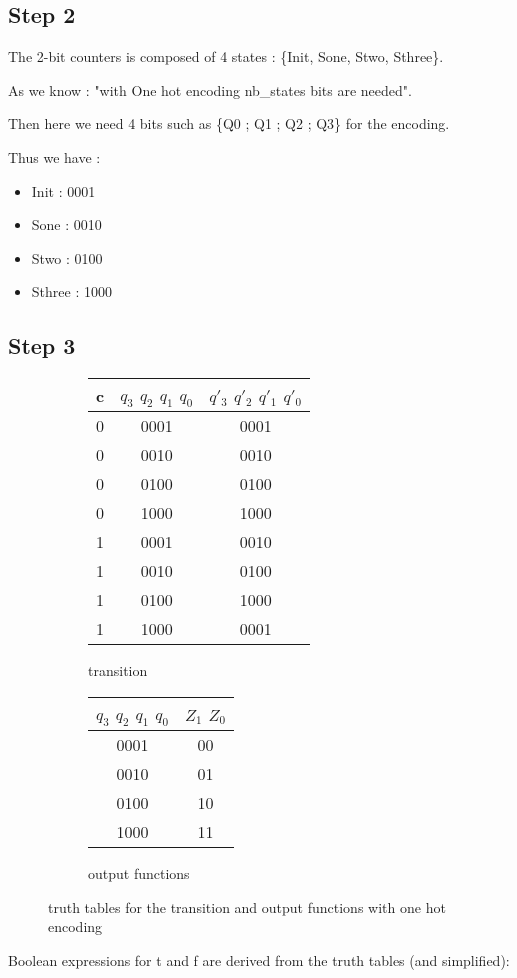 \documentclass{article}
\begin{document}
  
 

\subsection{Step 2}

The 2-bit counters is composed of 4 states : \{Init, Sone, Stwo, Sthree\}.

As we know  : "with One hot encoding  nb\_states bits are needed". 

Then here we need 4 bits such as \{Q0 ; Q1 ; Q2 ; Q3\} for the encoding. 

Thus we have : 
\begin{itemize}
\item Init : 0001
\item Sone : 0010
\item Stwo : 0100
\item Sthree : 1000
\end{itemize}

\subsection{Step 3}


\begin{figure}[h!]
\begin{subfigure}{0.5\textwidth}
\centering
	\begin{tabular}{l | c | c}
	
	c &  $q_3$ $q_2$ $q_1$ $q_0$ &  $q'_3$ $q'_2$ $q'_1$ $q'_0$ \\
\hline	
   0 &  0001 &  0001 \\
   0 & 0010 & 0010 \\
   0 & 0100 & 0100  \\
   0 & 1000 & 1000 \\
   1 & 0001 & 0010 \\
   1 & 0010 & 0100 \\
   1 & 0100  & 1000 \\
   1 & 1000 &  0001 \\
 \end{tabular}

 \caption{transition}
\end{subfigure}
\hfill 
\begin{subfigure}{0.5\textwidth}
\centering
  \begin{tabular}{ c | c}
	
	 $q_3$ $q_2$ $q_1$ $q_0$ & $Z_1$ $Z_0$ \\
\hline	
    0001 & 00 \\
    0010 & 01 \\
   0100 & 10  \\
    1000 & 11 \\
   
 \end{tabular}
  \caption{output functions}
\end{subfigure}
 
 \caption{ truth tables for the transition and output functions with one hot encoding}
 \end{figure}
 \newpage
Boolean expressions for t and f are derived from the truth tables (and simplified): 
\end{document}
